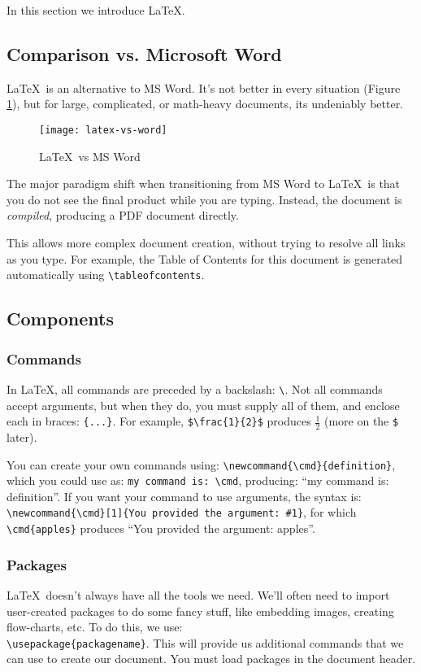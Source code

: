 In this section we introduce \LaTeX.
\subsection{Comparison vs. Microsoft Word}
\LaTeX\ is an alternative to MS Word.
It's not better in every situation (Figure \ref{fig:latex-vs-word}),
but for large, complicated, or math-heavy documents,
its undeniably better.
\begin{figure}[H]
  \centering\texttt{[image: latex-vs-word]}
  \caption{\LaTeX\ vs MS Word}%
  \label{fig:latex-vs-word}
\end{figure}
\par
The major paradigm shift when transitioning from MS Word to \LaTeX\ is that
you do not see the final product while you are typing.
Instead, the document is \textit{compiled},
producing a PDF document directly.
\par
This allows more complex document creation,
without trying to resolve all links as you type.
For example, the Table of Contents for this document is generated automatically using
\lstinline|\tableofcontents|.
\subsection{Components}
\subsubsection{Commands}
In \LaTeX, all commands are preceded by a backslash: \lstinline|\|.
Not all commands accept arguments, but when they do, you must supply all of them,
and enclose each in braces: \lstinline|{...}|.
For example, \lstinline|$\frac{1}{2}$| produces $\frac{1}{2}$ (more on the \lstinline|$| later).
\par
You can create your own commands using:
\lstinline|\newcommand{\cmd}{definition}|,
which you could use as:
\lstinline|my command is: \cmd|,
producing:
``my command is: definition''.
If you want your command to use arguments, the syntax is:
\lstinline|\newcommand{\cmd}[1]{You provided the argument: #1}|,
for which
\lstinline|\cmd{apples}|
produces
``You provided the argument: apples''.
\subsubsection{Packages}
\LaTeX\ doesn't always have all the tools we need.
We'll often need to import user-created packages to do some fancy stuff,
like embedding images, creating flow-charts, etc.
To do this, we use:\\
\lstinline|\usepackage{packagename}|.
This will provide us additional commands that we can use to create our document.
You must load packages in the document header.
